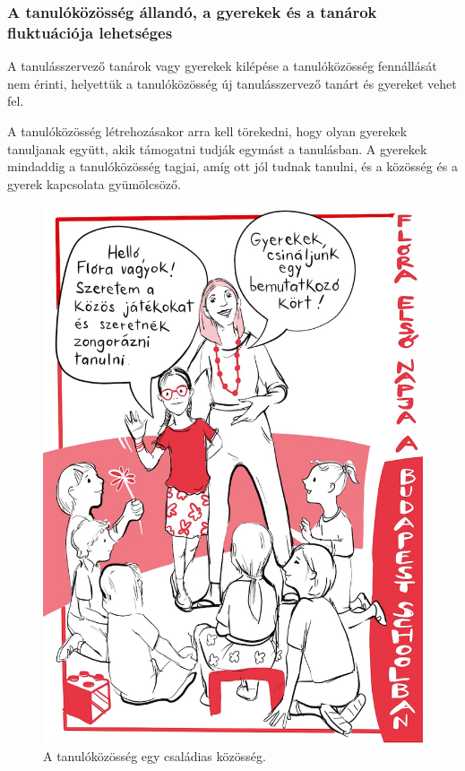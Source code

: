 \hypertarget{a-tanulokozosseg-allando-a-gyerekek-es-a-tanarok-fluktuacioja-lehetseges}{%
\subsubsection{A tanulóközösség állandó, a gyerekek és a tanárok
fluktuációja
lehetséges}\label{a-tanulokozosseg-allando-a-gyerekek-es-a-tanarok-fluktuacioja-lehetseges}}

A tanulásszervező tanárok vagy gyerekek kilépése a tanulóközösség
fennállását nem érinti, helyettük a tanulóközösség új tanulásszervező
tanárt és gyereket vehet fel.

A tanulóközösség létrehozásakor arra kell törekedni, hogy olyan gyerekek
tanuljanak együtt, akik támogatni tudják egymást a tanulásban. A
gyerekek mindaddig a tanulóközösség tagjai, amíg ott jól tudnak tanulni,
és a közösség és a gyerek kapcsolata gyümölcsöző.

\begin{figure}
\centering
\includegraphics{pics/1b_mikroisk_flora.jpg}
\caption{A tanulóközösség egy családias közösség.}
\end{figure}

